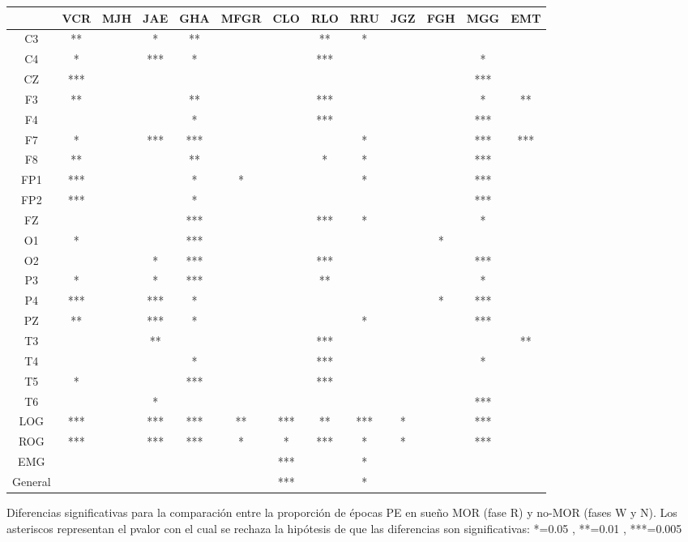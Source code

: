 \begin{SidewaysFigure}
\centering
\begin{tabular}{c||ccccc||cccc||ccc}
&VCR&MJH&JAE&GHA&MFGR&CLO&RLO&RRU&JGZ&FGH&MGG&EMT \\
\hline
C3&**& &*&**& & &**&*& & & &  \\
C4&*& &***&*& & &***& & & &*&  \\
CZ&***& & & & & & & & & &***&  \\
F3&**& & &**& & &***& & & &*&** \\
F4& & & &*& & &***& & & &***&  \\
F7&*& &***&***& & & &*& & &***&*** \\
F8&**& & &**& & &*&*& & &***&  \\
FP1&***& & &*&*& & &*& & &***&  \\
FP2&***& & &*& & & & & & &***&  \\
FZ& & & &***& & &***&*& & &*&  \\
O1&*& & &***& & & & & &*& &  \\
O2& & &*&***& & &***& & & &***& \\ 
P3&*& &*&***& & &**& & & &*&  \\
P4&***& &***&*& & & & & &*&***&  \\
PZ&**& &***&*& & & &*& & &***&  \\
T3& & &**& & & &***& & & & &** \\
T4& & & &*& & &***& & & &*&  \\
T5&*& & &***& & &***& & & & &  \\
T6& & &*& & & & & & & &***&  \\
LOG&***& &***&***&**&***&**&***&*& &***&  \\
ROG&***& &***&***&*&*&***&*&*& &***&  \\
EMG& & & & & &***& &*& & & &  \\
\hline
General& & & & & &***& &*& & & & 
\end{tabular}
\caption{Diferencias significativas para la comparaci\'on entre la proporci\'on
de \'epocas PE en sue\~no MOR (fase R) y no-MOR (fases W y N).
Los asteriscos representan el pvalor con el cual se rechaza la hip\'otesis de
que las diferencias son significativas: *=0.05 , **=0.01 , ***=0.005}
\label{comparacion_mor_vs_total}
\end{SidewaysFigure}

